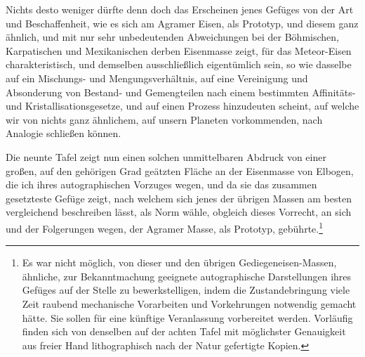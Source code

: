 \documentclass[a4paper, 11pt, oneside, german]{article}
\begin{document}
{Nichts desto weniger dürfte denn doch das Erscheinen jenes Gefüges von der Art und Beschaffenheit, wie es sich am Agramer Eisen, als Prototyp, und diesem ganz ähnlich, und mit nur sehr unbedeutenden Abweichungen bei der Böhmischen, Karpatischen und Mexikanischen derben Eisenmasse zeigt, für das Meteor-Eisen charakteristisch, und demselben ausschließlich eigentümlich sein, so wie dasselbe auf ein Mischungs- und Mengungsverhältnis, auf eine Vereinigung und Absonderung von Bestand- und Gemengteilen nach einem bestimmten Affinitäts- und Kristallisationsgesetze, und auf einen Prozess hinzudeuten scheint, auf welche wir von nichts ganz ähnlichem, auf unsern Planeten vorkommenden, nach Analogie schließen können.}

Die neunte Tafel zeigt nun einen solchen unmittelbaren Abdruck von einer großen, auf den gehörigen Grad geätzten Fläche an der Eisenmasse von Elbogen, die ich ihres autographischen Vorzuges wegen, und da sie das zusammen gesetzteste Gefüge zeigt, nach welchem sich jenes der übrigen Massen am besten vergleichend beschreiben lässt, als Norm wähle, obgleich dieses Vorrecht, an sich und der Folgerungen wegen, der Agramer Masse, als Prototyp, gebührte.\footnote{Es war nicht möglich, von dieser und den übrigen Gediegeneisen-Massen, ähnliche, zur Bekanntmachung geeignete autographische Darstellungen ihres Gefüges auf der Stelle zu bewerkstelligen, indem die Zustandebringung viele Zeit raubend mechanische Vorarbeiten und Vorkehrungen notwendig gemacht hätte. Sie sollen für eine künftige Veranlassung vorbereitet werden. Vorläufig finden sich von denselben auf der achten Tafel mit möglichster Genauigkeit aus freier Hand lithographisch nach der Natur gefertigte Kopien.}
\end{document}
